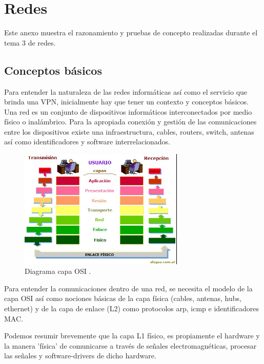 \chapter{Redes}\label{S:anexo_D}
Este anexo muestra el razonamiento y pruebas de concepto realizadas durante el tema 3 de  redes.

\section{Conceptos básicos}

Para entender la naturaleza de las redes informáticas así como el servicio que brinda una VPN, inicialmente hay que tener un contexto y conceptos básicos. Una red es un conjunto de dispositivos informáticos interconectados por medio físico o inalámbrico. Para la apropiada conexión y gestión de las comunicaciones entre los dispositivos existe una infraestructura, cables, routers, switch, antenas así como identificadores y software interrelacionados.

\begin{figure}[!htb]
\begin{center}
\includegraphics[width=0.7\textwidth]{./figuras/capas_osi}
\caption{Diagrama capa OSI \cite{c_osi}.}
\label{F:capas_osi}
\end{center}
\end{figure}

Para entender la comunicaciones dentro de una red, se necesita el modelo de la capa OSI\cite{c_osi} así como nociones básicas de la capa física (cables, antenas, hubs, ethernet) y de la capa de enlace (L2) como protocolos arp, icmp e identificadores MAC.

Podemos resumir brevemente que la capa L1 físico, es propiamente el hardware y la manera 'física' de comunicarse a través de señales electromagnéticas, procesar las señales y software-drivers de dicho hardware.

